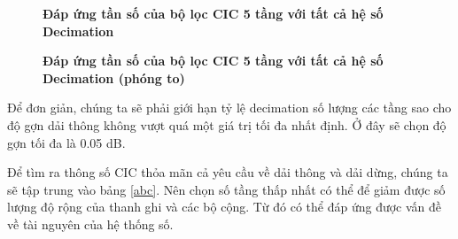 \begin{figure}[H]
    \centering
    
    \caption[Đáp ứng tần số của bộ lọc CIC 5 tầng với tất cả hệ số Decimation]{\bfseries \fontsize{12pt}{0pt}\selectfont Đáp ứng tần số của bộ lọc CIC 5 tầng với tất cả hệ số Decimation}
    \label{cic_ratios_overview}
\end{figure}

\begin{figure}[H]
    \centering
    
    \caption[Đáp ứng tần số của bộ lọc CIC 5 tầng với tất cả hệ số Decimation (phóng to)]{\bfseries \fontsize{12pt}{0pt}\selectfont Đáp ứng tần số của bộ lọc CIC 5 tầng với tất cả hệ số Decimation (phóng to)}
    \label{cic_ratios_zoom}
\end{figure}

Để đơn giản, chúng ta sẽ phải giới hạn tỷ lệ decimation số lượng các tầng sao cho độ gợn dải thông không vượt quá một giá trị tối đa nhất định. Ở đây sẽ chọn độ gợn tối đa là 0.05 dB.

Để tìm ra thông số CIC thỏa mãn cả yêu cầu về dải thông và dải dừng, chúng ta sẽ tập trung vào bảng \ref{abc}. Nên chọn số tầng thấp nhất có thể để giảm được số lượng độ rộng của thanh ghi và các bộ cộng. Từ đó có thể đáp ứng được vấn đề về tài nguyên của hệ thống số.

